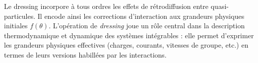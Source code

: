 Le dressing incorpore à tous ordres les effets de rétrodiffusion entre quasi-particules. Il encode ainsi les corrections d’interaction aux grandeurs physiques initiales $f(\theta)$. L’opération de \emph{dressing} joue un rôle central dans la description thermodynamique et dynamique des systèmes intégrables : elle permet d’exprimer les grandeurs physiques effectives (charges, courants, vitesses de groupe, etc.) en termes de leurs versions habillées par les interactions. %
%
%
%
%
%
%
%
%
%
